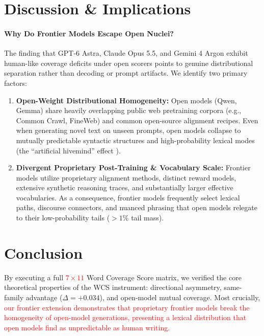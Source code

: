 \documentclass[11pt,a4paper,twocolumn]{article}
\newcommand{\diff}[1]{\textcolor{red}{#1}}
\begin{document}
\section{Discussion \& Implications}

\paragraph{Why Do Frontier Models Escape Open Nuclei?}
The finding that GPT-6 Astra, Claude Opus 5.5, and Gemini 4 Argon exhibit human-like coverage deficits under open scorers points to genuine distributional separation rather than decoding or prompt artifacts. We identify two primary factors:
\begin{enumerate}
    \item \textbf{Open-Weight Distributional Homogeneity:} Open models (Qwen, Gemma) share heavily overlapping public web pretraining corpora (e.g., Common Crawl, FineWeb) and common open-source alignment recipes. Even when generating novel text on unseen prompts, open models collapse to mutually predictable syntactic structures and high-probability lexical modes (the ``artificial hivemind'' effect \cite{jiang2025artificial}).
    \item \textbf{Divergent Proprietary Post-Training \& Vocabulary Scale:} Frontier models utilize proprietary alignment methods, distinct reward models, extensive synthetic reasoning traces, and substantially larger effective vocabularies. As a consequence, frontier models frequently select lexical paths, discourse connectors, and nuanced phrasing that open models relegate to their low-probability tails ($>1\%$ tail mass).
\end{enumerate}

\section{Conclusion}
By executing a full \diff{$7\times11$} Word Coverage Score matrix, we verified the core theoretical properties of the WCS instrument: directional asymmetry, same-family advantage ($\Delta = +0.034$), and open-model mutual coverage. Most crucially, \diff{our frontier extension demonstrates that proprietary frontier models break the homogeneity of open-model generations, presenting a lexical distribution that open models find as unpredictable as human writing.}



\end{document}
